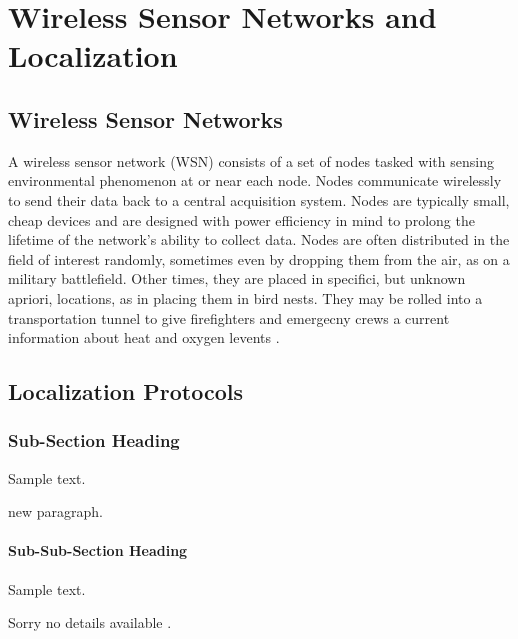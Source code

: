 \chapter{Wireless Sensor Networks and Localization}
\section{Wireless Sensor Networks}

A wireless sensor network (WSN) consists of a set of nodes tasked with sensing environmental phenomenon at or near each node.  Nodes communicate wirelessly to send their data back to a central acquisition system.  Nodes are typically small, cheap devices and are designed with power efficiency in mind to prolong the lifetime of the network's ability to collect data.  Nodes are often distributed in the field of interest randomly, sometimes even by dropping them from the air, as on a military battlefield.  Other times, they are placed in specifici, but unknown apriori, locations, as in placing them in bird nests\cite{birds}.  They may be rolled into a transportation tunnel to give firefighters and emergecny crews a current information about heat and oxygen levents \cite{runes}. 
\section{Localization Protocols}

\subsection{Sub-Section Heading}
Sample text.

new paragraph.

\subsubsection{Sub-Sub-Section Heading}
Sample text.

Sorry no details available \cite{Smith,doe2}.
